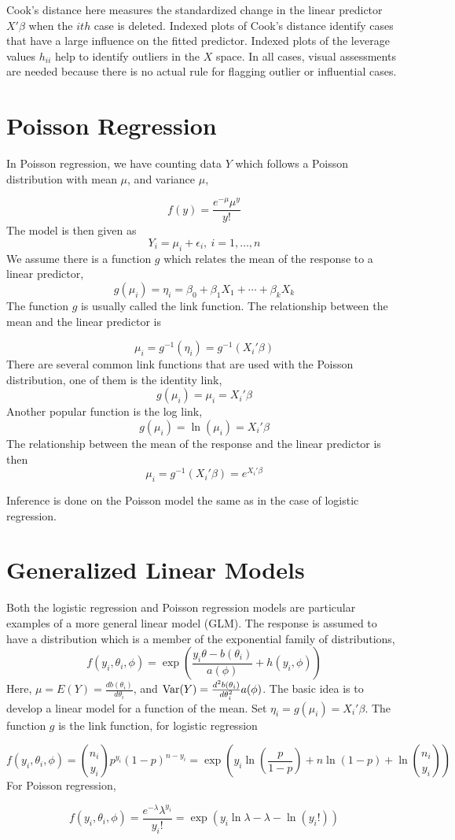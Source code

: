 Cook's distance here measures the standardized change in the linear predictor $X'\beta$ when the $ith$ case is deleted. Indexed plots of Cook's distance identify cases that have a large influence on the fitted predictor. Indexed plots of the leverage values $h_{ii}$ help to identify outliers in the $X$ space. In all cases, visual assessments are needed because there is no actual rule for flagging outlier or influential cases.


\section{Poisson Regression}

In Poisson regression, we have counting data $Y$ which follows a Poisson distribution with mean $\mu$, and variance $\mu$, 

\[f(y) = \frac{e^{-\mu}\mu^y}{y!}\]
The model is then given as 
\[Y_i = \mu_i + \epsilon_i, \ i = 1, \ldots, n\]
We assume there is a function $g$ which relates the mean of the response to a linear predictor,
\[g(\mu_i) = \eta_i = \beta_0 + \beta_1X_1 + \cdots + \beta_kX_k\]
The function $g$ is usually called the link function. The relationship between the mean and the linear predictor is 

\[\mu_i = g^{-1}(\eta_i) = g^{-1}(X_i'\beta)\]
There are several common link functions that are used with the Poisson distribution, one of them is the identity link, 
\[g(\mu_i) = \mu_i = X_i'\beta\]
Another popular function is the log link,
\[g(\mu_i) = \ln(\mu_i) = X_i'\beta\]
The relationship between the mean of the response and the linear predictor is then 
\[\mu_i = g^{-1}(X_i'\beta) = e^{X_i'\beta}\]

Inference is done on the Poisson model the same as in the case of logistic regression. 

\section{Generalized Linear Models}

Both the logistic regression and Poisson regression models are particular examples of a more general linear model (GLM). The response is assumed to have a distribution which is a member of the exponential family of distributions, 
\[f(y_i, \theta_i, \phi) = \exp\left(\frac{y_i\theta - b(\theta_i)}{a(\phi)} + h(y_i, \phi)\right)\]
Here, $\mu = E(Y) = \frac{db(\theta_i)}{d\theta_i}$, and $\operatorname{Var}(Y) = \frac{d^2b(\theta_i)}{d\theta_i^2}a(\phi)$. The basic idea is to develop a linear model for a function of the mean. Set $\eta_i = g(\mu_i) = X_i'\beta$. The function $g$ is the link function, for logistic regression 

\[f(y_i,\theta_i, \phi) = {n_i \choose y_i}p^{y_i}(1-p)^{n-y_i} = \exp\left(y_i \ln\left(\frac{p}{1-p}\right) + n\ln (1-p) + \ln{n_i \choose y_i}\right)\]
For Poisson regression,

\[f(y_i, \theta_i, \phi) = \frac{e^{-\lambda}\lambda^{y_i}}{y_i!}= \exp\left(y_i\ln \lambda - \lambda - \ln(y_i!)\right)\]